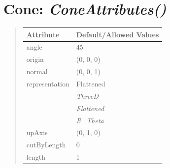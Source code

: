 \documentclass[letterpaper,10pt,english]{sphinxmanual}
\begin{document}
\begin{DUlineblock}{0em}
\item[] 
\end{DUlineblock}

\begin{DUlineblock}{0em}
\item[] 
\end{DUlineblock}


\section{\textbf{Cone}: \emph{ConeAttributes()}}
\label{attributes:cone-coneattributes}
\begin{DUlineblock}{0em}
\item[] 
\end{DUlineblock}
\begin{quote}

\begin{tabulary}{\linewidth}{|L|L|}
\hline

\textbf{Attribute}
 & 
\textbf{Default/Allowed Values}
\\
\hline
angle
 & 
45
\\
\hline
origin
 & 
(0, 0, 0)
\\
\hline
normal
 & 
(0, 0, 1)
\\
\hline
representation
 & 
Flattened
\\
\hline & 
\emph{ThreeD}
\\
\hline & 
\emph{Flattened}
\\
\hline & 
\emph{R\_Theta}
\\
\hline
upAxis
 & 
(0, 1, 0)
\\
\hline
cutByLength
 & 
0
\\
\hline
length
 & 
1
\\
\hline\end{tabulary}

\end{quote}

\begin{DUlineblock}{0em}
\item[] 
\end{DUlineblock}

\begin{DUlineblock}{0em}
\item[] 
\end{DUlineblock}
\end{document}
